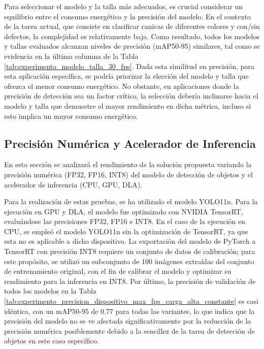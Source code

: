 \documentclass[11pt,spanish,listoffigures,listoftables]{tfgetsinf}
\begin{document}
Para seleccionar el modelo y la talla más adecuados, es crucial considerar un equilibrio entre el consumo energético y la precisión del modelo. En el contexto de la tarea actual, que consiste en clasificar canicas de diferentes colores y con/sin defectos, la complejidad es relativamente baja.
Como resultado, todos los modelos y tallas evaluados alcanzan niveles de precisión (mAP50-95) similares, tal como se evidencia en la última columna de la Tabla \ref{tab:experimento_modelo_talla_30_fps}.
Dada esta similitud en precisión, para esta aplicación específica, se podría priorizar la elección del modelo y talla que ofrezca el menor consumo energético.
No obstante, en aplicaciones donde la precisión de detección sea un factor crítico, la selección debería inclinarse hacia el modelo y talla que demuestre el mayor rendimiento en dicha métrica, incluso si esto implica un mayor consumo energético.



\subsection{Precisión Numérica y Acelerador de Inferencia} \label{sub:precision_numerica_dispositivo}
En esta sección se analizará el rendimiento de la solución propuesta variando la precisión numérica (FP32, FP16, INT8) del modelo de detección de objetos y el acelerador de inferencia (CPU, GPU, DLA).

Para la realización de estas pruebas, se ha utilizado el modelo YOLO11n. Para la ejecución en GPU y DLA, el modelo fue optimizado con NVIDIA TensorRT, evaluándose las precisiones FP32, FP16 e INT8. En el caso de la ejecución en CPU, se empleó el modelo YOLO11n sin la optimización de TensorRT, ya que esta no es aplicable a dicho dispositivo. La exportación del modelo de PyTorch a TensorRT con precisión INT8 requiere un conjunto de datos de calibración; para este propósito, se utilizó un subconjunto de 100 imágenes extraídas del conjunto de entrenamiento original, con el fin de calibrar el modelo y optimizar su rendimiento para la inferencia en INT8. Por último, la precisión de validación de todos los modelos en la Tabla \ref{tab:experimento_precision_dispositivo_max_fps_carga_alta_constante} es casi idéntica, con un mAP50-95 de 0.77 para todas las variantes, lo que indica que la precisión del modelo no se ve afectada significativamente por la reducción de la precisión numérica posiblemente debido a la sencillez de la tarea de detección de objetos en este caso específico.
\end{document}

